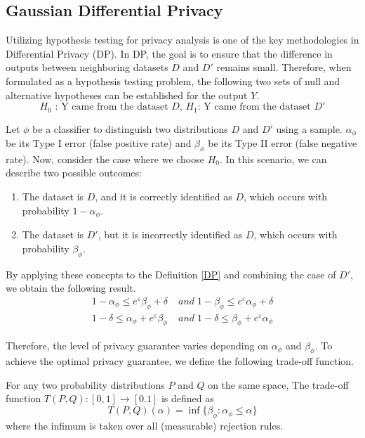 \documentclass{article}
\begin{document}
\subsection{Gaussian Differential Privacy}
Utilizing hypothesis testing for privacy analysis is one of the key methodologies in Differential Privacy (DP). In DP, the goal is to ensure that the difference in outputs between neighboring datasets $D$ and $D'$ remains small. Therefore, when formulated as a hypothesis testing problem, the following two sets of null and alternative hypotheses can be established for the output $Y$.
\begin{equation*}
    \text{$H_0$ : Y came from the dataset $D$, $H_1$: Y came from the dataset $D'$}  
\end{equation*}

Let $\phi$ be a classifier to distinguish two distributions $D$ and $D'$ using a sample. $\alpha_\phi$ be its Type I error (false positive rate) and $\beta_\phi$ be its Type II error (false negative rate). Now, consider the case where we choose $H_0$. In this scenario, we can describe two possible outcomes:
\begin{enumerate}
\item The dataset is $D$, and it is correctly identified as $D$, which occurs with probability $1-\alpha_\phi$.
\item The dataset is $D'$, but it is incorrectly identified as $D$, which occurs with probability $\beta_\phi$. 
\end{enumerate}
By applying these concepts to the Definition \ref{DP} and combining the case of $D'$, we obtain the following result.
\begin{align*}
    1-\alpha_\phi \le e^\varepsilon \beta_\phi + \delta\; &and \;  1-\beta_\phi \le e^\varepsilon \alpha_\phi + \delta \\
    1-\delta \le  \alpha_\phi + e^\varepsilon \beta_\phi\; &and \;1-\delta \le  \beta_\phi + e^\varepsilon \alpha_\phi 
\end{align*}

Therefore, the level of privacy guarantee varies depending on $\alpha_\phi$ and $\beta_\phi$. To achieve the optimal privacy guarantee, we define the following trade-off function.

\begin{definition}
 For any two probability distributions $P$ and $Q$ on the same space, The trade-off function $T(P,Q): [0,1] \to [0.1]$ is defined as 
\begin{equation*}
    T(P,Q)(\alpha) = \inf\{\beta_\phi:\alpha_\phi \leqslant \alpha\}
\end{equation*}
where the infimum is taken over all (measurable) rejection rules.
\end{definition}


\end{document}
